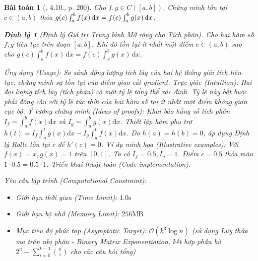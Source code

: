 \documentclass{article}
\newtheorem{baitoan}{Bài toán}
\newtheorem{dinhly}{Định lý}
\begin{document}
\begin{baitoan}[\cite{Quoc_Long_Dat_Nam_VMC}, 4.10., p. 200]
	Cho $f,g\in C([a,b])$. Chứng minh tồn tại $c\in(a,b)$ thỏa $g(c)\int_a^b f(x)\,{\rm d}x = f(c)\int_a^b g(x)\,{\rm d}x$.

\begin{dinhly}[Định lý Giá trị Trung bình Mở rộng cho Tích phân]
Cho hai hàm số $f, g$ liên tục trên đoạn $[a, b]$. Khi đó tồn tại ít nhất một điểm $c \in (a, b)$ sao cho $g(c) \int_a^b f(x) \, \mathrm{d}x = f(c) \int_a^b g(x) \, \mathrm{d}x$.
\end{dinhly}
\emph{Ứng dụng (Usage):} So sánh động lượng tích lũy của hai hệ thống giải tích liên tục, chứng minh sự tồn tại của điểm giao cắt gradient.
\emph{Trực giác (Intuition):} Hai đại lượng tích lũy (tích phân) có một tỷ lệ tổng thể xác định. Tỷ lệ này bắt buộc phải đồng cấu với tỷ lệ tức thời của hai hàm số tại ít nhất một điểm không gian cục bộ.
\emph{Ý tưởng chứng minh (Ideas of proofs):} Khai báo hằng số tích phân $I_f = \int_a^b f(x)\mathrm{d}x$ và $I_g = \int_a^b g(x)\mathrm{d}x$. Thiết lập hàm phụ trợ $h(t) = I_f \int_a^t g(x)\mathrm{d}x - I_g \int_a^t f(x)\mathrm{d}x$. Do $h(a) = h(b) = 0$, áp dụng Định lý Rolle tồn tại $c$ để $h'(c) = 0$.
\emph{Ví dụ minh họa (Illustrative examples):} Với $f(x)=x, g(x)=1$ trên $[0, 1]$. Ta có $I_f = 0.5, I_g = 1$. Điểm $c = 0.5$ thỏa mãn $1 \cdot 0.5 = 0.5 \cdot 1$.
\emph{Triển khai thuật toán (Code implementation):}



    \vspace{0.5em}
    \emph{Yêu cầu lập trình (Computational Constraint):}
    \begin{itemize}
        \item Giới hạn thời gian (Time Limit): $1.0\mathrm{s}$
        \item Giới hạn bộ nhớ (Memory Limit): $256\mathrm{MB}$
        \item Mục tiêu độ phức tạp (Asymptotic Target): $\mathcal{O}(k^3 \log n)$ (sử dụng Lũy thừa ma trận nhị phân - Binary Matrix Exponentiation, kết hợp phần bù $2^n - \sum_{i=0}^{k-1} \binom{n}{i}$ cho các câu hỏi tổng)
    \end{itemize}
\end{baitoan}
\end{document}
